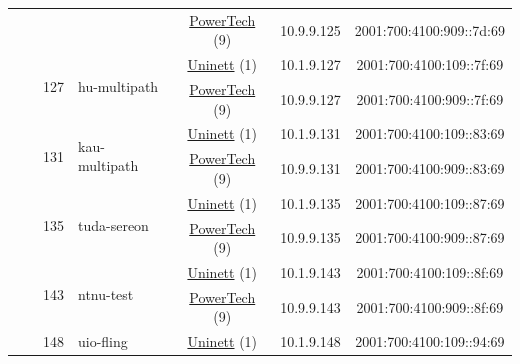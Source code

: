 \begin{small}
\begin{center}
\begin{longtable}{|c|c|c|c|c|c|c|c|}
  &  &  &  & \multicolumn{2}{|c|}{\tiny{\href{http://www.powertech.no}{PowerTech} (9)}} & \tiny{10.9.9.125} & \tiny{2001:700:4100:909::7d:69} \\* \cline{3-3}\cline{4-4}\cline{5-5}\cline{6-6}\cline{7-7}\cline{8-8}
  &  & \multirow{2}{*}{\tiny{127}} & \multicolumn{1}{|l|}{\multirow{2}{*}{\tiny{hu-multipath}}} & \multicolumn{2}{|c|}{\tiny{\href{https://www.uninett.no}{Uninett} (1)}} & \tiny{10.1.9.127} & \tiny{2001:700:4100:109::7f:69} \\* \cline{5-5}\cline{6-6}\cline{7-7}\cline{8-8}
  &  &  &  & \multicolumn{2}{|c|}{\tiny{\href{http://www.powertech.no}{PowerTech} (9)}} & \tiny{10.9.9.127} & \tiny{2001:700:4100:909::7f:69} \\* \cline{3-3}\cline{4-4}\cline{5-5}\cline{6-6}\cline{7-7}\cline{8-8}
  &  & \multirow{2}{*}{\tiny{131}} & \multicolumn{1}{|l|}{\multirow{2}{*}{\tiny{kau-multipath}}} & \multicolumn{2}{|c|}{\tiny{\href{https://www.uninett.no}{Uninett} (1)}} & \tiny{10.1.9.131} & \tiny{2001:700:4100:109::83:69} \\* \cline{5-5}\cline{6-6}\cline{7-7}\cline{8-8}
  &  &  &  & \multicolumn{2}{|c|}{\tiny{\href{http://www.powertech.no}{PowerTech} (9)}} & \tiny{10.9.9.131} & \tiny{2001:700:4100:909::83:69} \\* \cline{3-3}\cline{4-4}\cline{5-5}\cline{6-6}\cline{7-7}\cline{8-8}
  &  & \multirow{2}{*}{\tiny{135}} & \multicolumn{1}{|l|}{\multirow{2}{*}{\tiny{tuda-sereon}}} & \multicolumn{2}{|c|}{\tiny{\href{https://www.uninett.no}{Uninett} (1)}} & \tiny{10.1.9.135} & \tiny{2001:700:4100:109::87:69} \\* \cline{5-5}\cline{6-6}\cline{7-7}\cline{8-8}
  &  &  &  & \multicolumn{2}{|c|}{\tiny{\href{http://www.powertech.no}{PowerTech} (9)}} & \tiny{10.9.9.135} & \tiny{2001:700:4100:909::87:69} \\* \cline{3-3}\cline{4-4}\cline{5-5}\cline{6-6}\cline{7-7}\cline{8-8}
  &  & \multirow{2}{*}{\tiny{143}} & \multicolumn{1}{|l|}{\multirow{2}{*}{\tiny{ntnu-test}}} & \multicolumn{2}{|c|}{\tiny{\href{https://www.uninett.no}{Uninett} (1)}} & \tiny{10.1.9.143} & \tiny{2001:700:4100:109::8f:69} \\* \cline{5-5}\cline{6-6}\cline{7-7}\cline{8-8}
  &  &  &  & \multicolumn{2}{|c|}{\tiny{\href{http://www.powertech.no}{PowerTech} (9)}} & \tiny{10.9.9.143} & \tiny{2001:700:4100:909::8f:69} \\* \cline{3-3}\cline{4-4}\cline{5-5}\cline{6-6}\cline{7-7}\cline{8-8}
  &  & \multirow{2}{*}{\tiny{148}} & \multicolumn{1}{|l|}{\multirow{2}{*}{\tiny{uio-fling}}} & \multicolumn{2}{|c|}{\tiny{\href{https://www.uninett.no}{Uninett} (1)}} & \tiny{10.1.9.148} & \tiny{2001:700:4100:109::94:69} \\* \cline{5-5}\cline{6-6}\cline{7-7}\cline{8-8}

\end{longtable}
\end{center}
\end{small}
